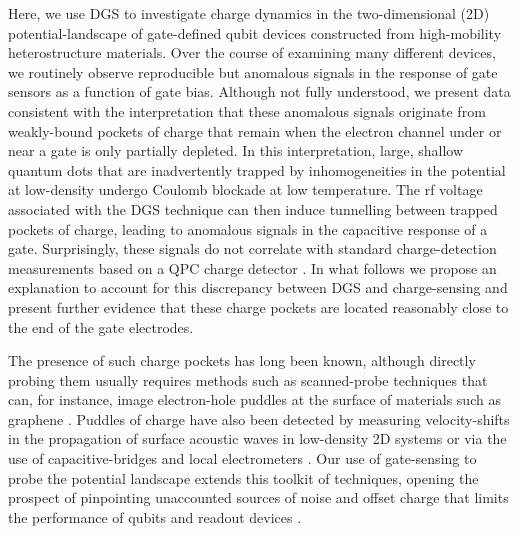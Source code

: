 Here, we use DGS to investigate charge dynamics in the two-dimensional (2D) potential-landscape of gate-defined qubit devices constructed from high-mobility heterostructure materials. Over the course of examining many different devices, we routinely observe reproducible but anomalous signals in the response of gate sensors as a function of gate bias. Although not fully understood, we present data consistent with the interpretation that these anomalous signals originate from weakly-bound pockets of charge that remain when the electron channel under or near a gate is only partially depleted. In this interpretation, large, shallow quantum dots that are inadvertently trapped by inhomogeneities in the potential at low-density \cite{PhysRevB.41.7929} undergo Coulomb blockade at low temperature. The rf voltage associated with the DGS technique can then induce tunnelling between trapped pockets of charge, leading to anomalous signals in the capacitive response of a gate. Surprisingly, these signals do not correlate with standard charge-detection measurements based on a QPC charge detector \cite{PhysRevLett.70.1311}. In what follows we propose an explanation to account for this discrepancy between DGS and charge-sensing and present further evidence that these charge pockets are located reasonably close to the end of the gate electrodes.

The presence of such charge pockets has long been known, although directly probing them usually requires methods such as scanned-probe techniques \cite{Finkelstein90} that can, for instance, image electron-hole puddles \cite{PhysRevB.84.115442} at the surface of materials such as graphene \cite{Yacoby_scanned}. Puddles of charge have also been detected by measuring velocity-shifts in the propagation of surface acoustic waves in low-density 2D systems \cite{TRACY2006150} or via the use of capacitive-bridges \cite{Ashoori_science} and local electrometers \cite{Ilani1354}. Our use of gate-sensing to probe the potential landscape extends this toolkit of techniques, opening the prospect of pinpointing unaccounted sources of noise and offset charge that limits the performance of qubits and readout devices \cite{PhysRevLett.110.146804,Shulman202,Zoo_2Q}.

